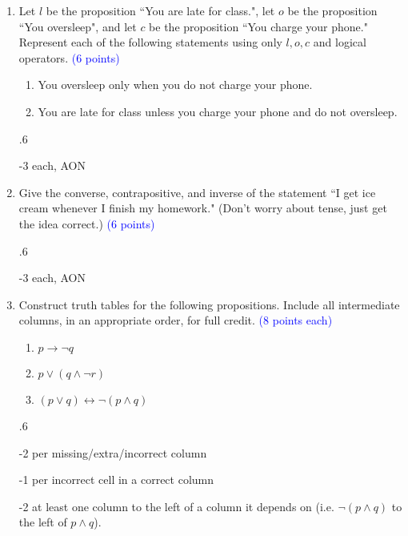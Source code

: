 \documentclass{article}
\newcommand{\pt}[1]{\textcolor{blue}{(#1 points)}}
\newcommand{\pte}[1]{\textcolor{blue}{(#1 points each)}}
\newenvironment{rubric} {
    \par
    \begin{spacing}{.6}
    \begin{itshape}
    \color{red}
} {
    \end{itshape}
    \end{spacing}
    \par
}
\begin{document}
\begin{enumerate}
    \begin{rubric}
    -3 each, AON
    \end{rubric}
    
    \item Let $l$ be the proposition ``You are late for class.", let $o$ be the proposition ``You oversleep", and let $c$ be the proposition ``You charge your phone." Represent each of the following statements using only $l, o, c$ and logical operators. \pt 6
    
    \begin{enumerate}
        \item You oversleep only when you do not charge your phone.
        \item You are late for class unless you charge your phone and do not oversleep.
    \end{enumerate}
    
    \begin{rubric}
    -3 each, AON
    \end{rubric}
    
    \item Give the converse, contrapositive, and inverse of the statement ``I get ice cream whenever I finish my homework." (Don't worry about tense, just get the idea correct.) \pt 6
    
    \begin{rubric}
    -3 each, AON
    \end{rubric}
    
    \item Construct truth tables for the following propositions. Include all intermediate columns, in an appropriate order, for full credit. \pte 8
    
    \begin{enumerate}
        \item $p \rightarrow \lnot q$
        \item $p \vee (q \wedge \lnot r)$
        
        \item $(p \vee q) \leftrightarrow \lnot (p \wedge q)$
    \end{enumerate}
    
    \begin{rubric}
    -2 per missing/extra/incorrect column
    
    -1 per incorrect cell in a correct column
    
    -2 at least one column to the left of a column it depends on (i.e. $\lnot (p \wedge q)$ to the left of $p \wedge q$).
    

\end{rubric}
\end{enumerate}
\end{document}
